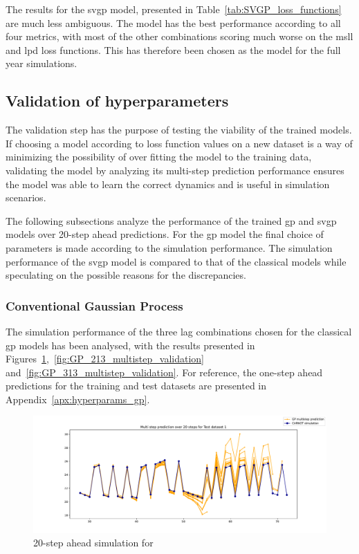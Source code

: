 The results for the \acrshort{svgp} model, presented in
Table~\ref{tab:SVGP_loss_functions} are much less ambiguous. The 
model has the best performance according to all four metrics, with most of the
other combinations scoring much worse on the \acrshort{msll} and \acrshort{lpd}
loss functions. This has therefore been chosen as the model for the full year
simulations.


\subsection{Validation of hyperparameters}\label{sec:validation_hyperparameters}

The validation step has the purpose of testing the viability of the trained
models. If choosing a model according to loss function values on a new dataset
is a way of minimizing the possibility of over fitting the model to the training
data, validating the model by analyzing its multi-step prediction performance
ensures the model was able to learn the correct dynamics and is useful in
simulation scenarios.

The following subsections analyze the performance of the trained \acrshort{gp}
and \acrshort{svgp} models over 20-step ahead predictions. For the \acrshort{gp}
model the final choice of parameters is made according to the simulation
performance. The simulation performance of the \acrshort{svgp} model is compared
to that of the classical models while speculating on the possible reasons for
the discrepancies.

\subsubsection{Conventional Gaussian Process}

The simulation performance of the three lag combinations chosen for the
classical \acrlong{gp} models has been analysed, with the results presented in
Figures~\ref{fig:GP_113_multistep_validation},~\ref{fig:GP_213_multistep_validation}
and~\ref{fig:GP_313_multistep_validation}. For reference, the one-step ahead
predictions for the training and test datasets are presented in
Appendix~\ref{apx:hyperparams_gp}.


\begin{figure}[ht]
    \centering
    \includegraphics[width =
    \textwidth]{Plots/GP_113_-1pts_test_prediction_20_steps.pdf}
    \vspace{-25pt}
    \caption{20-step ahead simulation for }
    \label{fig:GP_113_multistep_validation}
\end{figure}

